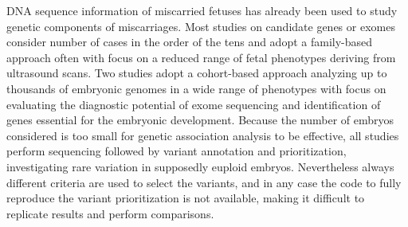 \documentclass[fleqn,12pt]{wlscirep}
\begin{document}
DNA sequence information of miscarried fetuses has already been used to study genetic components of miscarriages.\cite{rajcan2020next, filges2015exome} Most studies on candidate genes\cite{bondeson2017nonsense, dohrn2015ecel1, wilbe2015musk, cristofoli2017novel, rae2015novel, thomas2012tctn3} or exomes\cite{shamseldin2015identification, qiao2016whole,fu2018whole, meier2019exome, yates2017whole} consider number of cases in the order of the tens and adopt a family-based approach often with focus on a reduced range of fetal phenotypes deriving from ultrasound scans. 
Two studies adopt a cohort-based approach analyzing up to thousands of embryonic genomes in a wide range of phenotypes with focus on evaluating the diagnostic potential of exome sequencing\cite{zhao2020exome} and identification of genes essential for the embryonic development.\cite{chen2017characterization}
Because the number of embryos considered is too small for genetic association analysis to be effective, all studies perform sequencing followed by variant annotation and prioritization, investigating rare variation in supposedly euploid embryos. Nevertheless always different criteria are used to select the variants, and in any case the code to fully reproduce the variant prioritization is not available, making it difficult to replicate results and perform comparisons.
\end{document}
